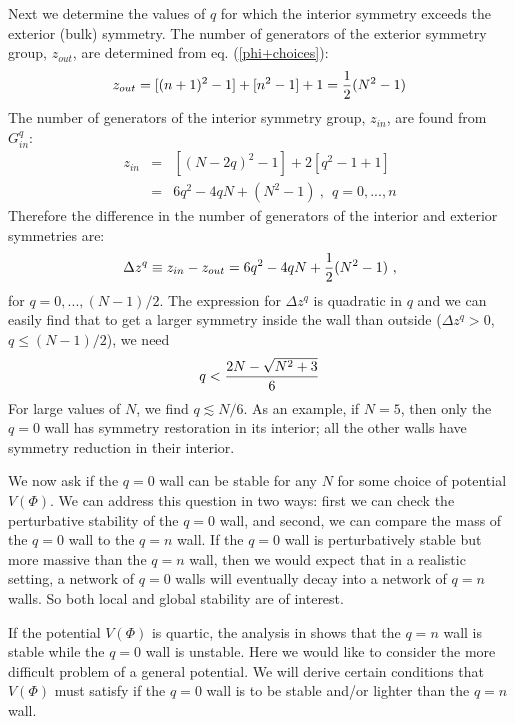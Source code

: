 \documentclass[a4paper,prd,nofootinbib,twocolumn,showpacs]{revtex4}
\begin{document}
Next we determine the values of $q$ for which the interior
symmetry exceeds the exterior (bulk) symmetry. The number
of generators of the exterior symmetry group, $z_{out}$, 
are determined from eq. (\ref{phi+choices}):
\begin{equation}
z_{out} = [(n+1)^2-1]+[n^2-1]+1={1\over 2}(N^2-1)
\label{zout}
\end{equation}
The number of generators of the interior symmetry group,
$z_{in}$, are found from $G_{in}^q$:
\begin{eqnarray}
z_{in} &=& [(N-2q)^2-1]+ 2[q^2-1+1] \nonumber \\
       &=& 6q^2 -4qN + (N^2-1) \ , \ \ q=0,...,n 
\label{zin}
\end{eqnarray}
Therefore the difference in the number of generators of
the interior and exterior symmetries are:
\begin{equation}
\Delta z^q \equiv z_{in}-z_{out} 
           = 6q^2-4qN + {1\over 2}(N^2-1) \ , 
\label{Deltazq}
\end{equation}
for $q = 0,...,(N-1)/2$.
The expression for $\Delta z^q$ is quadratic in $q$ and we can 
easily find that to get a larger symmetry inside the wall than 
outside ($\Delta z^q > 0$, $q \le (N-1)/2$), we need
\begin{equation}
q < {{2N - \sqrt{N^2+3}}\over 6}
\label{qbound}
\end{equation}
{}For large values of $N$, we find $q \lesssim N/6$. As an example,
if $N=5$, then only the $q=0$ wall has symmetry restoration in
its interior; all the other walls have symmetry reduction in
their interior.

We now ask if the $q=0$ wall can be stable for any $N$ for some
choice of potential $V(\Phi )$. We can address this question in
two ways: first we can check the perturbative stability of the
$q=0$ wall, and second, we can compare the mass of the $q=0$
wall to the $q=n$ wall. If the $q=0$ wall is perturbatively
stable but more massive than the $q=n$ wall, then we would
expect that in a realistic setting, a network of $q=0$ walls
will eventually decay into a network of $q=n$ walls. So both
local and global stability are of interest.

If the potential $V(\Phi )$ is quartic, the analysis in 
\cite{PogVac00b,PogVac01,Vac01} shows that the $q=n$ wall
is stable while the $q=0$ wall is unstable. Here we would like
to consider the more difficult problem of a general potential.
We will derive certain conditions that $V(\Phi )$ must satisfy
if the $q=0$ wall is to be stable and/or lighter than the
$q=n$ wall.
\end{document}
